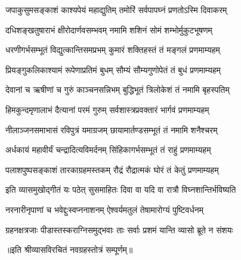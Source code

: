 

\twolineshloka
{जपाकुसुमसङ्काशं काश्यपेयं महाद्युतिम्}
{तमोरिं सर्वपापघ्नं प्रणतोऽस्मि दिवाकरम्}

\twolineshloka
{दधिशङ्खतुषाराभं क्षीरोदार्णवसम्भवम्}
{नमामि शशिनं सोमं शम्भोर्मुकुटभूषणम्}

\twolineshloka
{धरणीगर्भसम्भूतं विद्युत्कान्तिसमप्रभम्}
{कुमारं शक्तिहस्तं तं मङ्गलं प्रणमाम्यहम्}

\twolineshloka
{प्रियङ्गुकलिकाश्यामं रूपेणाप्रतिमं बुधम्}
{सौम्यं सौम्यगुणोपेतं तं बुधं प्रणमाम्यहम्}

\twolineshloka
{देवानां च ऋषीणां च गुरुं काञ्चनसन्निभम्}
{बुद्धिभूतं त्रिलोकेशं तं नमामि बृहस्पतिम्}

\twolineshloka
{हिमकुन्दमृणालाभं दैत्यानां परमं गुरुम्}
{सर्वशास्त्रप्रवक्तारं भार्गवं प्रणमाम्यहम्}

\twolineshloka
{नीलाञ्जनसमाभासं रविपुत्रं यमाग्रजम्}
{छायामार्तण्डसम्भूतं तं नमामि शनैश्चरम्}

\twolineshloka
{अर्धकायं महावीर्यं चन्द्रादित्यविमर्दनम्}
{सिंहिकागर्भसम्भूतं तं राहुं प्रणमाम्यहम्}

\twolineshloka
{पलाशपुष्पसङ्काशं तारकाग्रहमस्तकम्}
{रौद्रं रौद्रात्मकं घोरं तं केतुं प्रणमाम्यहम्}

\twolineshloka
{इति व्यासमुखोद्गीतं यः पठेत् सुसमाहितः}
{दिवा वा यदि वा रात्रौ विघ्नशान्तिर्भविष्यति}

\twolineshloka
{नरनारीनृपाणां च भवेद्दुःस्वप्ननाशनम्}
{ऐश्वर्यमतुलं तेषामारोग्यं पुष्टिवर्धनम्}

\twolineshloka
{ग्रहनक्षत्रजाः पीडास्तस्कराग्निसमुद्भवाः}
{ताः सर्वाः प्रशमं यान्ति व्यासो ब्रूते न संशयः}

॥इति श्रीव्यासविरचितं नवग्रहस्तोत्रं सम्पूर्णम्॥

